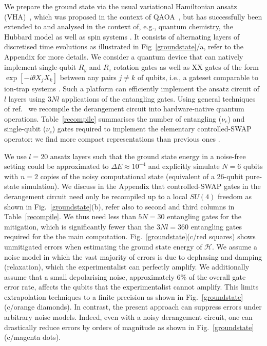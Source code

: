 \documentclass[aps,prx,showpacs,twocolumn,reprint]{revtex4-2}
\begin{document}
{We prepare the ground state via the usual variational Hamiltonian ansatz
(VHA)~\cite{cerezo2020variationalreview,endo2020hybrid,bharti2021noisy}, which
was proposed in the context of QAOA~\cite{farhi2014quantum,pagano2020quantum,arute2020quantum},
but has successfully been extended to and analysed in the context of, e.g., quantum chemistry, the Hubbard model
as well as spin systems \cite{babbush2018low,wecker2015progress,cade2020strategies,PRXQuantum.1.020319}.
It consists of alternating layers of discretised time evolutions as illustrated in Fig~\ref{groundstate}/a,
refer to the Appendix for more details.
We consider a quantum device that can natively implement single-qubit $R_y$ and $R_z$ rotation
gates as well as XX gates of the form $\exp[-i\theta X_j X_k]$ between any pairs $j \neq k$ of qubits, i.e.,
a gateset comparable to ion-trap systems \cite{pogorelov2021compact}. Such a platform can efficiently implement
the ansatz circuit of $l$ layers using $3Nl$ applications of the entangling gates.
Using general techniques of ref.~\cite{khatri2019quantumassisted} we
recompile the derangement circuit into hardware-native quantum operations.
Table~\ref{recompile} summarises the number of entangling
($\nu_e$) and single-qubit ($\nu_s$) gates required to implement
the elementary controlled-SWAP operator: we find more compact representations
than previous ones \cite{PhysRevLett.75.748,smolin1996five}.


We use $l=20$ ansatz layers such that the ground state energy in a noise-free setting could be approximated to $\Delta E \approx 10^{-4}$
and explicitly simulate $N=6$ qubits with $n=2$ copies of the noisy computational state (equivalent of a 26-qubit pure-state simulation).
We discuss in the Appendix that controlled-SWAP gates in the derangement circuit need only
be recompiled up to a local $SU(4)$ freedom as shown in Fig.~\ref{groundstate}(b),
refer also to second and third columns in Table~\ref{recompile}.
We thus need less than $5 N = 30$ entangling gates for the mitigation, which
is significantly fewer than the $3Nl = 360$ entangling gates required for the the main computation.
Fig.~\ref{groundstate}(c/red squares) shows unmitigated errors when estimating the ground state energy
of $\mathcal{H}$. We assume a noise model in which the vast majority of errors is due to dephasing
and damping (relaxation), which the experimentalist can perfectly amplify.
We additionally assume that a small depolarising noise,
approximately $6\%$ of the overall gate error rate,
affects the qubits that the experimentalist cannot amplify.
This limits extrapolation techniques \cite{endo2020hybrid,Li2017,PhysRevX.8.031027, kandala2018extending,PhysRevLett.119.180509,cai2020multi}
to a finite precision as shown in Fig.~\ref{groundstate}(c/orange diamonds).
In contrast, the present approach can suppress errors under arbitrary noise models.
Indeed, even with a noisy derangement
circuit, one can drastically reduce errors by orders of magnitude as shown in Fig.~\ref{groundstate}(c/magenta dots). 







}
\end{document}
